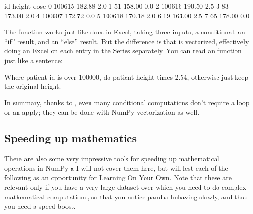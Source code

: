 \documentclass[letterpaper,10pt,english]{sphinxmanual}
\begin{document}
\begin{sphinxVerbatim}[commandchars=\\\{\}]
  

\PYG{p}{[}\PYG{p}{]}   \PYG{p}{[}\PYG{p}{]}   \PYG{p}{[}\PYG{p}{]}   \PYG{p}{[}\PYG{p}{]} 
\end{sphinxVerbatim}

\begin{sphinxVerbatim}[commandchars=\\\{\}]
       id  height  dose
0  100615  182.88   2.0
1      51  158.00   0.0
2  100616  190.50   2.5
3      83  173.00   2.0
4  100607  172.72   0.0
5  100618  170.18   2.0
6      19  163.00   2.5
7      65  178.00   0.0
\end{sphinxVerbatim}

The  function works just like  does in Excel, taking three inputs, a conditional, an “if” result, and an “else” result.  But the difference is that  is vectorized, effectively doing an Excel  on each entry in the Series separately.  You can read an  function just like a sentence:

Where patient id is over 100000, do patient height times 2.54, otherwise just keep the original height.

In summary, thanks to , even many conditional computations don’t require a loop or an apply; they can be done with NumPy vectorization as well.


\subsection{Speeding up mathematics}
\label{\detokenize{chapter-11-processing-rows:speeding-up-mathematics}}
There are also some very impressive tools for speeding up mathematical operations in NumPy a   I will not cover them here, but will lest each of the following as an opportunity for Learning On Your Own.  Note that these are relevant only if you have a very large dataset over which you need to do complex mathematical computations, so that you notice pandas behaving slowly, and thus you need a speed boost.
\end{document}
